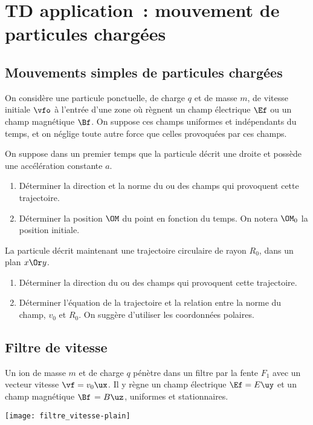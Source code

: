 \documentclass[a4paper, 12pt, final, garamond]{book}
\begin{document}
\setcounter{chapter}{4}

\chapter{TD application~: mouvement de particules charg\'ees}

\section{Mouvements simples de particules chargées}

On considère une particule ponctuelle, de charge $q$ et de masse $m$, de vitesse
initiale $\vfo$ à l'entrée d'une zone où règnent un champ électrique $\Ef$ ou un
champ magnétique $\Bf$. On suppose ces champs uniformes et indépendants du
temps, et on néglige toute autre force que celles provoquées par ces champs.

On suppose dans un premier temps que la particule décrit une droite et possède
une accélération constante $a$. \bigbreak

\begin{enumerate}
    \item Déterminer la direction et la norme du ou des champs qui provoquent
        cette trajectoire.
    \item Déterminer la position $\OM$ du point en fonction du temps. On
        notera $\OM_0$ la position initiale.
\end{enumerate} \bigbreak

La particule décrit maintenant une trajectoire circulaire de rayon $R_0$, dans
un plan $x\Or y$. \bigbreak

\begin{enumerate}[resume]
    \item Déterminer la direction du ou des champs qui provoquent cette
        trajectoire.
    \item Déterminer l'équation de la trajectoire et la relation entre la norme
        du champ, $v_0$ et $R_0$. On suggère d'utiliser les coordonnées
        polaires.
\end{enumerate}

\section{Filtre de vitesse}

\begin{minipage}[c]{0.50\linewidth}
    Un ion de masse $m$ et de charge $q$ pénètre dans un filtre par la fente $F_1$
    avec un vecteur vitesse $\vf = v_0\ux$. Il y règne un champ électrique $\Ef =
    E\uy$ et un champ magnétique $\Bf$ = $B\uz$, uniformes et stationnaires.
\end{minipage}
\hfill
\begin{minipage}[c]{0.50\linewidth}
    \begin{center}
        \texttt{[image: filtre\_vitesse-plain]}
        \label{fig:fdv}
    \end{center}
\end{minipage}
\hfill~
\end{document}
